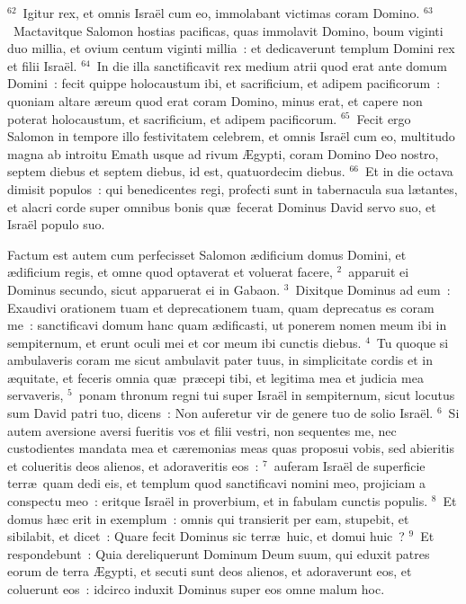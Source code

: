 ${}^{62}$~Igitur rex, et omnis Isra\"el cum eo, immolabant victimas coram Domino.
${}^{63}$~Mactavitque Salomon hostias pacificas, quas immolavit Domino, boum viginti duo millia, et ovium centum viginti millia~: et dedicaverunt templum Domini rex et filii Isra\"el.
${}^{64}$~In die illa sanctificavit rex medium atrii quod erat ante domum Domini~: fecit quippe holocaustum ibi, et sacrificium, et adipem pacificorum~: quoniam altare \ae reum quod erat coram Domino, minus erat, et capere non poterat holocaustum, et sacrificium, et adipem pacificorum.
${}^{65}$~Fecit ergo Salomon in tempore illo festivitatem celebrem, et omnis Isra\"el cum eo, multitudo magna ab introitu Emath usque ad rivum \AE gypti, coram Domino Deo nostro, septem diebus et septem diebus, id est, quatuordecim diebus.
${}^{66}$~Et in die octava dimisit populos~: qui benedicentes regi, profecti sunt in tabernacula sua l\ae tantes, et alacri corde super omnibus bonis qu\ae\ fecerat Dominus David servo suo, et Isra\"el populo suo.

\bchapter
\lettrine[lines=3,image=true,loversize=0.05,lraise=-0.03]{F}{}actum est autem cum perfecisset Salomon \ae dificium domus Domini, et \ae dificium regis, et omne quod optaverat et voluerat facere,
${}^{2}$~apparuit ei Dominus secundo, sicut apparuerat ei in Gabaon.
${}^{3}$~Dixitque Dominus ad eum~: Exaudivi orationem tuam et deprecationem tuam, quam deprecatus es coram me~: sanctificavi domum hanc quam \ae dificasti, ut ponerem nomen meum ibi in sempiternum, et erunt oculi mei et cor meum ibi cunctis diebus.
${}^{4}$~Tu quoque si ambulaveris coram me sicut ambulavit pater tuus, in simplicitate cordis et in \ae quitate, et feceris omnia qu\ae\ pr\ae cepi tibi, et legitima mea et judicia mea servaveris,
${}^{5}$~ponam thronum regni tui super Isra\"el in sempiternum, sicut locutus sum David patri tuo, dicens~: Non auferetur vir de genere tuo de solio Isra\"el.
${}^{6}$~Si autem aversione aversi fueritis vos et filii vestri, non sequentes me, nec custodientes mandata mea et c\ae remonias meas quas proposui vobis, sed abieritis et colueritis deos alienos, et adoraveritis eos~:
${}^{7}$~auferam Isra\"el de superficie terr\ae\ quam dedi eis, et templum quod sanctificavi nomini meo, projiciam a conspectu meo~: eritque Isra\"el in proverbium, et in fabulam cunctis populis.
${}^{8}$~Et domus h\ae c erit in exemplum~: omnis qui transierit per eam, stupebit, et sibilabit, et dicet~: Quare fecit Dominus sic terr\ae\ huic, et domui huic~?
${}^{9}$~Et respondebunt~: Quia dereliquerunt Dominum Deum suum, qui eduxit patres eorum de terra \AE gypti, et secuti sunt deos alienos, et adoraverunt eos, et coluerunt eos~: idcirco induxit Dominus super eos omne malum hoc.


